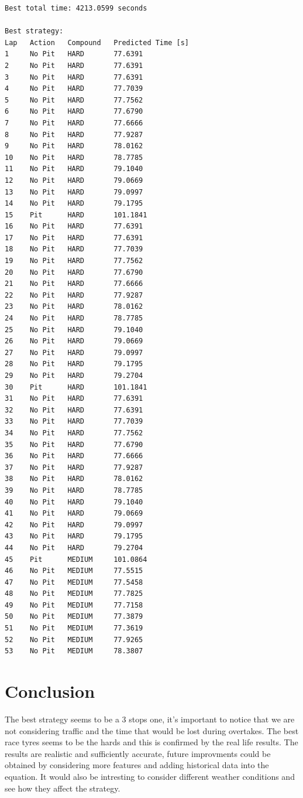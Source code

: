 \documentclass[12pt,a4paper]{article}
\begin{document}
\begin{Verbatim}[frame=single, fontsize=\footnotesize , xleftmargin=1em]
Best total time: 4213.0599 seconds

Best strategy:
Lap   Action   Compound   Predicted Time [s]
1     No Pit   HARD       77.6391
2     No Pit   HARD       77.6391
3     No Pit   HARD       77.6391
4     No Pit   HARD       77.7039
5     No Pit   HARD       77.7562
6     No Pit   HARD       77.6790
7     No Pit   HARD       77.6666
8     No Pit   HARD       77.9287
9     No Pit   HARD       78.0162
10    No Pit   HARD       78.7785
11    No Pit   HARD       79.1040
12    No Pit   HARD       79.0669
13    No Pit   HARD       79.0997
14    No Pit   HARD       79.1795
15    Pit      HARD       101.1841
16    No Pit   HARD       77.6391
17    No Pit   HARD       77.6391
18    No Pit   HARD       77.7039
19    No Pit   HARD       77.7562
20    No Pit   HARD       77.6790
21    No Pit   HARD       77.6666
22    No Pit   HARD       77.9287
23    No Pit   HARD       78.0162
24    No Pit   HARD       78.7785
25    No Pit   HARD       79.1040
26    No Pit   HARD       79.0669
27    No Pit   HARD       79.0997
28    No Pit   HARD       79.1795
29    No Pit   HARD       79.2704
30    Pit      HARD       101.1841
31    No Pit   HARD       77.6391
32    No Pit   HARD       77.6391
33    No Pit   HARD       77.7039
34    No Pit   HARD       77.7562
35    No Pit   HARD       77.6790
36    No Pit   HARD       77.6666
37    No Pit   HARD       77.9287
38    No Pit   HARD       78.0162
39    No Pit   HARD       78.7785
40    No Pit   HARD       79.1040
41    No Pit   HARD       79.0669
42    No Pit   HARD       79.0997
43    No Pit   HARD       79.1795
44    No Pit   HARD       79.2704
45    Pit      MEDIUM     101.0864
46    No Pit   MEDIUM     77.5515
47    No Pit   MEDIUM     77.5458
48    No Pit   MEDIUM     77.7825
49    No Pit   MEDIUM     77.7158
50    No Pit   MEDIUM     77.3879
51    No Pit   MEDIUM     77.3619
52    No Pit   MEDIUM     77.9265
53    No Pit   MEDIUM     78.3807
\end{Verbatim}
\section{Conclusion}
The best strategy seems to be a 3 stops one, it's important to notice that we are not considering traffic and the time that would be lost during overtakes. The best race tyres seems to be the hards and this is confirmed by the real life results. The results are realistic and sufficiently accurate, future improvments could be obtained by considering more features and adding historical data into the equation. It would also be intresting to consider different weather conditions and see how they affect the strategy.
\end{document}
